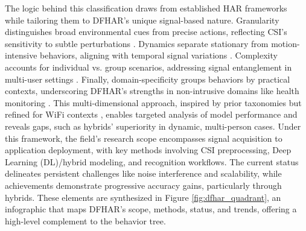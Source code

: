 \documentclass[Afour,sageh,times]{sagej}
\begin{document}
The logic behind this classification draws from established HAR frameworks while tailoring them to DFHAR's unique signal-based nature. Granularity distinguishes broad environmental cues from precise actions, reflecting CSI's sensitivity to subtle perturbations \citep{yousefi2017survey}. Dynamics separate stationary from motion-intensive behaviors, aligning with temporal signal variations \citep{zafari2019survey}. Complexity accounts for individual vs. group scenarios, addressing signal entanglement in multi-user settings \citep{venkatnarayan2018multiperson}. Finally, domain-specificity groups behaviors by practical contexts, underscoring DFHAR's strengths in non-intrusive domains like health monitoring \citep{wu2017devicefree}. This multi-dimensional approach, inspired by prior taxonomies but refined for WiFi contexts \citep{soto2022survey, Arshad:2022_har_review}, enables targeted analysis of model performance and reveals gaps, such as hybrids' superiority in dynamic, multi-person cases.
Under this framework, the field's research scope encompasses signal acquisition to application deployment, with key methods involving CSI preprocessing, Deep Learning (DL)/hybrid modeling, and recognition workflows. The current status delineates persistent challenges like noise interference and scalability, while achievements demonstrate progressive accuracy gains, particularly through hybrids. These elements are synthesized in Figure \ref{fig:dfhar_quadrant}, an infographic that maps DFHAR's scope, methods, status, and trends, offering a high-level complement to the behavior tree.
\end{document}
